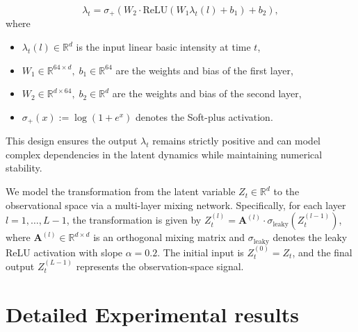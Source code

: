 \documentclass[10pt]{article}
\numberwithin{figure}{section}
\begin{document}
\begin{equation}
\lambda_t = \sigma_+\left( W_2 \cdot \mathrm{ReLU}(W_1\lambda_t(l)  + b_1) + b_2 \right),
\end{equation}
where
\begin{itemize}
  \item $\lambda_t(l) \in \mathbb{R}^{d}$ is the input linear basic intensity at time $t$,
  \item $W_1 \in \mathbb{R}^{64 \times d},\; b_1 \in \mathbb{R}^{64}$ are the weights and bias of the first layer,
  \item $W_2 \in \mathbb{R}^{d \times 64},\; b_2 \in \mathbb{R}^{d}$ are the weights and bias of the second layer,
  \item $\sigma_+(x) := \log(1 + e^x)$ denotes the Soft-plus activation.
\end{itemize}

This design ensures the output $\lambda_t$ remains strictly positive and can model complex dependencies in the latent dynamics while maintaining numerical stability. 

We model the transformation from the latent variable \( Z_t \in \mathbb{R}^d \) to the observational space via a multi-layer mixing network. Specifically, for each layer \( l = 1, \dots, L-1 \), the transformation is given by \( Z_t^{(l)} = \mathbf{A}^{(l)} \cdot \sigma_{\text{leaky}}(Z_t^{(l-1)}) \), where \( \mathbf{A}^{(l)} \in \mathbb{R}^{d \times d} \) is an orthogonal mixing matrix and \( \sigma_{\text{leaky}} \) denotes the leaky ReLU activation with slope \( \alpha = 0.2 \). The initial input is \( Z_t^{(0)} = Z_t \), and the final output \( Z_t^{(L-1)} \) represents the observation-space signal. 

\section{Detailed Experimental results}
\end{document}
